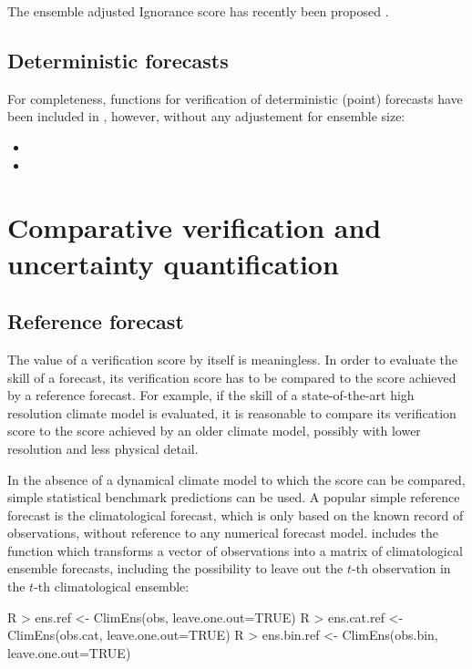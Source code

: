 \documentclass[article]{jss}
\begin{document}
The ensemble adjusted Ignorance score has recently been proposed \citep{siegert2015ignorance}.



\subsection{Deterministic forecasts}


For completeness, functions for verification of deterministic (point) forecasts have been included in , however, without any adjustement for ensemble size:
\begin{itemize}
\item {}
\item {}
\end{itemize}




\section{Comparative verification and uncertainty quantification}


\subsection{Reference forecast}

The value of a verification score by itself is meaningless.
In order to evaluate the skill of a forecast, its verification score has to be compared to the score achieved by a reference forecast.
For example, if the skill of a state-of-the-art high resolution climate model is evaluated, it is reasonable to compare its verification score to the score achieved by an older climate model, possibly with lower resolution and less physical detail.

In the absence of a dynamical climate model to which the score can be compared, simple statistical benchmark predictions can be used.
A popular simple reference forecast is the climatological forecast, which is only based on the known record of observations, without reference to any numerical forecast model.
 includes the function  which transforms a vector of observations into a matrix of climatological ensemble forecasts, including the possibility to leave out the $t$-th observation in the $t$-th climatological ensemble:

\begin{Schunk}
\begin{Sinput}
R > ens.ref     <- ClimEns(obs,     leave.one.out=TRUE)
R > ens.cat.ref <- ClimEns(obs.cat, leave.one.out=TRUE)
R > ens.bin.ref <- ClimEns(obs.bin, leave.one.out=TRUE)
\end{Sinput}
\end{Schunk}
\end{document}
